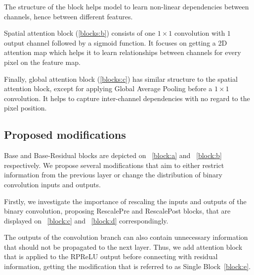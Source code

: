 \documentclass{article}
\begin{document}
The structure of the block helps model to learn non-linear dependencies between channels, hence between different features.

Spatial attention block (\ref{blocks:b}) consists of one $1\times1$ convolution with $1$ output channel followed by a sigmoid function. It focuses on getting a 2D attention map which helps it to learn relationships between channels for every pixel on the feature map.

Finally, global attention block (\ref{blocks:c}) has similar structure to the spatial attention block, except for applying Global Average Pooling before a $1 \times 1$ convolution. It helps to capture inter-channel dependencies with no regard to the pixel position.

\subsection{Proposed modifications}
Base and Base-Residual blocks are depicted on ~\ref{block:a} and ~\ref{block:b} respectively. We propose several modifications that aim to either restrict information from the previous layer or change the distribution of binary convolution inputs and outputs.

Firstly, we investigate the importance of rescaling the inputs and outputs of the binary convolution, proposing RescalePre and RescalePost blocks, that are displayed on ~\ref{block:c} and ~\ref{block:d} correspondingly. 

The outputs of the convolution branch can also contain unnecessary information that should not be propagated to the next layer. Thus, we add attention block that is applied to the RPReLU output before connecting with residual information, getting the modification that is referred to as Single Block~\ref{block:e}.
\end{document}
